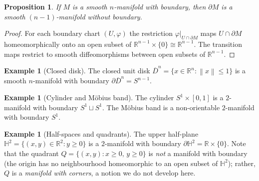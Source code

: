 \documentclass[12pt,a4paper,openany]{book}
\newtheorem{proposition}[theorem]{Proposition}
\theoremstyle{definition}
\newtheorem{example}[theorem]{Example}
\theoremstyle{remark}
\newcommand{\R}{\mathbb{R}}
\newcommand{\norm}[1]{\left\lVert #1 \right\rVert}
\begin{document}
\begin{proposition}\label{prop:boundary-manifold}
If $M$ is a smooth $n$-manifold with boundary, then $\partial M$ is a
smooth $(n-1)$-manifold without boundary.
\end{proposition}

\begin{proof}
For each boundary chart $(U, \varphi)$ the restriction
$\varphi|_{U \cap \partial M}$ maps $U \cap \partial M$ homeomorphically
onto an open subset of $\R^{n-1} \times \{0\} \cong \R^{n-1}$.  The
transition maps restrict to smooth diffeomorphisms between open subsets of
$\R^{n-1}$.
\end{proof}

\begin{example}[Closed disk]\label{ex:closed-disk}
The closed unit disk $\overline{D}^n = \{x \in \R^n : \norm{x} \leq 1\}$
is a smooth $n$-manifold with boundary $\partial \overline{D}^n = S^{n-1}$.
\end{example}

\begin{example}[Cylinder and M\"obius band]\label{ex:cylinder-moebius}
The cylinder $S^1 \times [0,1]$ is a $2$-manifold with boundary
$S^1 \sqcup S^1$.  The M\"obius band is a non-orientable $2$-manifold
with boundary $S^1$.
\end{example}

\begin{example}[Half-spaces and quadrants]\label{ex:half-space-examples}
The upper half-plane $\mathbb{H}^2 = \{(x,y) \in \R^2 : y \geq 0\}$ is a
$2$-manifold with boundary $\partial \mathbb{H}^2 = \R \times \{0\}$.
Note that the quadrant $Q = \{(x,y) : x \geq 0,\, y \geq 0\}$ is
\emph{not} a manifold with boundary (the origin has no neighbourhood
homeomorphic to an open subset of $\mathbb{H}^2$); rather, $Q$ is a
\emph{manifold with corners}, a notion we do
not develop here.
\end{example}

\end{document}
